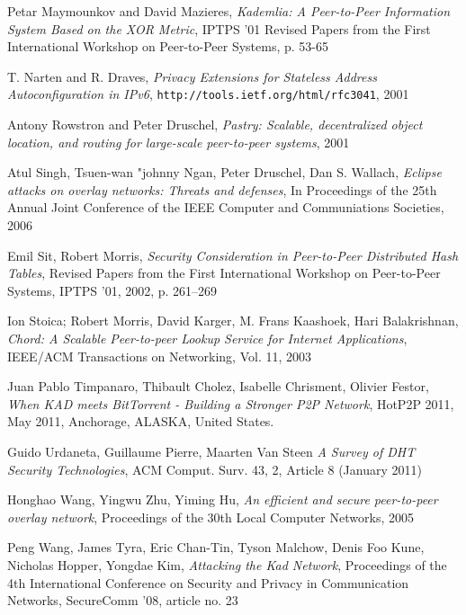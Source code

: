 \begin{thebibliography}{99}
  Petar Maymounkov and David Mazieres,
  \textit{Kademlia: A Peer-to-Peer Information System Based on the XOR Metric},
  IPTPS '01 Revised Papers from the First International Workshop on Peer-to-Peer
  Systems, p. 53-65

  T. Narten and R. Draves,
  \textit{Privacy Extensions for Stateless Address Autoconfiguration in IPv6},
  \texttt{http://tools.ietf.org/html/rfc3041},
  2001

  Antony Rowstron and Peter Druschel,
  \textit{Pastry: Scalable, decentralized object location, and routing for
  large-scale peer-to-peer systems}, 2001

  Atul Singh, Tsuen-wan "johnny Ngan, Peter Druschel, Dan S. Wallach,
  \textit{Eclipse attacks on overlay networks: Threats and defenses},
  In Proceedings of the 25th Annual Joint Conference of the IEEE Computer and
  Communiations Societies, 2006

  Emil Sit, Robert Morris,
  \textit{Security Consideration in Peer-to-Peer Distributed Hash Tables},
  Revised Papers from the First International Workshop on Peer-to-Peer Systems,
  IPTPS '01, 2002, p. 261--269

  Ion Stoica; Robert Morris, David Karger, M. Frans Kaashoek, Hari Balakrishnan,
  \textit{Chord: A Scalable Peer-to-peer Lookup Service for Internet
  Applications},
  IEEE/ACM Transactions on Networking, Vol. 11, 2003

  Juan Pablo Timpanaro, Thibault Cholez, Isabelle Chrisment, Olivier Festor,
  \textit{When KAD meets BitTorrent - Building a Stronger P2P Network},
  HotP2P 2011, May 2011, Anchorage, ALASKA, United States.

 Guido Urdaneta, Guillaume Pierre, Maarten Van Steen
\textit{A Survey of DHT Security Technologies}, ACM Comput. Surv.  43, 2,
Article 8 (January 2011)

  Honghao Wang, Yingwu Zhu, Yiming Hu,
  \textit{An efficient and secure peer-to-peer overlay network}, 
  Proceedings of the 30th Local Computer Networks,
  2005

  Peng Wang, James Tyra, Eric Chan-Tin, Tyson Malchow, Denis Foo Kune, Nicholas
  Hopper, Yongdae Kim,
  \textit{Attacking the Kad Network},
  Proceedings of the 4th International Conference on Security and Privacy in
  Communication Networks, SecureComm '08, article no. 23


\end{thebibliography}
